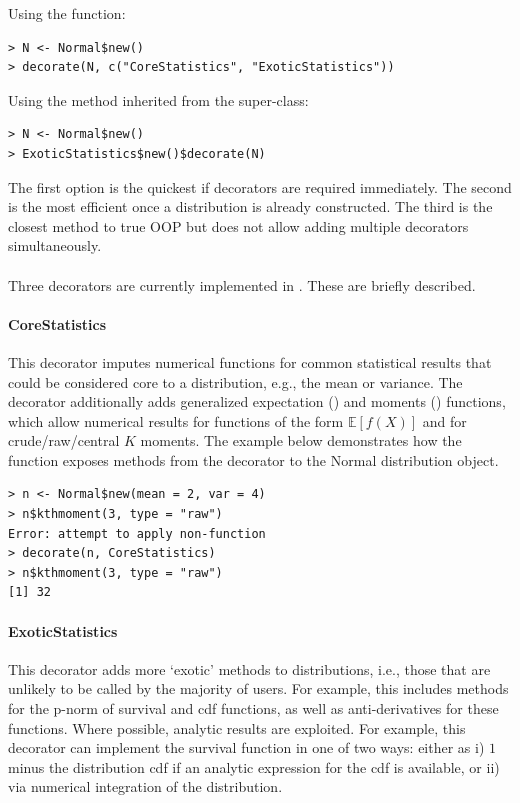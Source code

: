 \noindent Using the  function:
\begin{verbatim}
> N <- Normal$new()
> decorate(N, c("CoreStatistics", "ExoticStatistics"))
\end{verbatim}

\noindent Using the  method inherited from the  super-class:
\begin{verbatim}
> N <- Normal$new()
> ExoticStatistics$new()$decorate(N)
\end{verbatim}

The first option is the quickest if decorators are required immediately. The second is the most efficient once a distribution is already constructed. The third is the closest method to true OOP but does not allow adding multiple decorators simultaneously.
\\\\
Three decorators are currently implemented in . These are briefly described.

\paragraph{CoreStatistics} This decorator imputes numerical functions for common statistical results that could be considered core to a distribution, e.g., the mean or variance. The decorator additionally adds generalized expectation () and moments () functions, which allow numerical results for functions of the form $\mathbb{E}[f(X)]$ and for crude/raw/central $K$ moments. The example below demonstrates how the  function exposes methods from the  decorator to the Normal distribution object.

\begin{verbatim}
> n <- Normal$new(mean = 2, var = 4)
> n$kthmoment(3, type = "raw")
Error: attempt to apply non-function
> decorate(n, CoreStatistics)
> n$kthmoment(3, type = "raw")
[1] 32
\end{verbatim}

\paragraph{ExoticStatistics} This decorator adds more `exotic' methods to distributions, i.e., those that are unlikely to be called by the majority of users. For example, this includes methods for the p-norm of survival and cdf functions, as well as anti-derivatives for these functions. Where possible, analytic results are exploited. For example, this decorator can implement the survival function in one of two ways: either as i) $1$ minus the distribution cdf if an analytic expression for the cdf is available, or ii) via numerical integration of the distribution.

